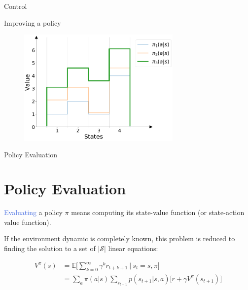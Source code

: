 \documentclass{beamer}
\begin{document}
\begin{frame}{Control}

Improving a policy

\begin{figure}[t]
\includegraphics[width=8cm]{./images/pi3.png}
\centering
\end{figure}

\end{frame}


\begin{frame}{Policy Evaluation}
\section{Policy Evaluation}

\textcolor{RoyalBlue}{Evaluating} a policy $\pi$ means computing its state-value function (or state-action value function).

\vspace{2mm}

If the environment dynamic is completely known, this problem is reduced to finding the solution to a set of $\mathcal{|S|}$ linear equations:



\begin{align*}
    V^{\pi}(s)& = \mathds{E} \bigg[\sum_{k=0}^{\infty}\gamma^{k} r_{t+k+1} \: \bigg| \: s_t=s,\pi \bigg] \\
		   & = \sum_a \pi(a|s) \sum_{s_{t+1}} p(s_{t+1}|s,a)\big[r + \gamma V^{\pi}({s_{t+1}}) \big] 
\end{align*}

\end{frame}
\end{document}
